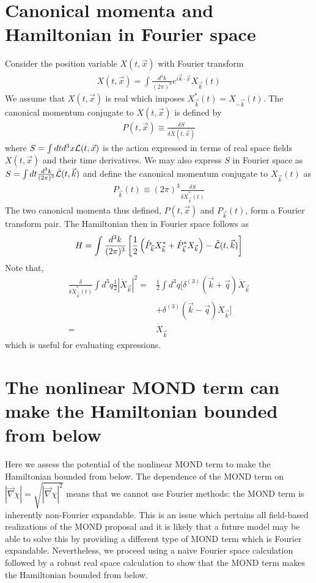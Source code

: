 \documentclass[twocolumn,prd,preprintnumbers,amsmath,amssymb,nofootinbib,superscriptaddress]{revtex4-1}
\newcommand{\grad}{\ensuremath{\vec{\nabla}}}
\newcommand{\Lcal}{{\cal L}}
\begin{document}
\appendix

\section{Canonical momenta and Hamiltonian in Fourier space}
\label{Def_Fourier_Ham}
Consider the  position variable $X(t,\vec{x})$ with Fourier transform
\begin{align}
X(t,\vec{x}) = \int \frac{d^3k}{(2\pi)^3} e^{i\vec{k}\cdot\vec{x}} X_{\vec{k}}(t)
\end{align}
We assume that $X(t,\vec{x})$ is real which imposes $ X^*_{\vec{k}}(t) =  X_{-\vec{k}}(t)$.
The canonical momentum conjugate to  $X(t,\vec{x})$ is defined by
\begin{align}
P(t,\vec{x}) \equiv \frac{\delta S}{\delta \dot{X}(t,\vec{x})}
\end{align}
where $S = \int dt d^3x \Lcal(t,\vec{x})$ is the action expressed in terms of real space fields $X(t,\vec{x})$ and their time derivatives. We may also express $S$ in Fourier space
as $S = \int dt \frac{d^3k}{(2\pi)^3}  \tilde{\Lcal}(t,\vec{k})$ and define the  canonical momentum conjugate to $X_{\vec{k}}(t)$ as
\begin{align}
P_{\vec{k}}(t) \equiv (2\pi)^3 \frac{\delta S}{\delta \dot{X}^*_{\vec{k}}(t)} 
\end{align}
The two canonical momenta thus defined, $P(t,\vec{x})$ and $P_{\vec{k}}(t)$, form a Fourier transform pair. The Hamiltonian then in Fourier space follows as
\begin{align}
H = \int  \frac{d^3k}{(2\pi)^3} \left[ \frac{1}{2} \left( \dot{P}_{\vec{k}} X_{\vec{k}}^* + \dot{P}^*_{\vec{k}} X_{\vec{k}} \right) -  \tilde{\Lcal}(t,\vec{k}) \right]
\end{align}
Note that, 
\begin{align} 
\frac{\delta }{\delta \dot{X}^*_{\vec{k}}(t)}\int d^3q \frac{1}{2} |\dot{X}_{\vec{k}}|^2 
 =& \frac{1}{2} \int d^3q  \bigg[ \delta^{(3)}(\vec{k} + \vec{q}) \dot{X}_{\vec{k}} 
\nonumber
\\
\ \ \ \ 
& + \delta^{(3)}(\vec{k} - \vec{q})  \dot{X}_{\vec{k}}
\bigg] 
\nonumber
\\
=& \dot{X}_{\vec{k}} 
\end{align}
which is useful for evaluating expressions.

\section{The nonlinear MOND term can make the Hamiltonian bounded from below}
\label{Append}
Here we assess the potential of the nonlinear MOND term to make the Hamiltonian bounded from below. The dependence of the MOND term on
$|\grad \chi| = \sqrt{|\grad \chi|^2}$ means that we cannot use Fourier methods: the MOND term is inherently non-Fourier expandable. This is an issue which pertains all field-based realizations of the MOND proposal and it is likely that a future model may be able to solve this by providing a different type of MOND term which is Fourier expandable. 
Nevertheless, we proceed using a naive Fourier space calculation followed by a robust real space calculation to show that the MOND term makes the Hamiltonian bounded from below.
\end{document}
